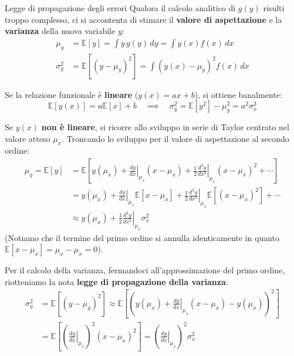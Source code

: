 \documentclass[openany,a4paper,12pt]{book}
\theoremstyle{remark}
\begin{document}
\begin{bressan}{Legge di propagazione degli errori}
Qualora il calcolo analitico di $g(y)$ risulti troppo complesso, ci si accontenta di stimare il \textbf{valore di aspettazione} e la \textbf{varianza} della nuova variabile $y$:
\begin{align*}
    \mu_y &= \mathbb{E}[y] = \int y \, g(y) \, dy = \int y(x) f(x) \, dx \\
    \sigma_y^2 &= \mathbb{E}[(y - \mu_y)^2] = \int (y(x) - \mu_y)^2 f(x) \, dx
\end{align*}

Se la relazione funzionale è \textbf{lineare} ($y(x) = ax + b$), si ottiene banalmente:
\begin{equation}
    \mathbb{E}[y(x)] = a\mathbb{E}[x] + b \quad \implies \quad \sigma_y^2 = \mathbb{E}[y^2] - \mu_y^2 = a^2\sigma_x^2
\end{equation}

Se $y(x)$ \textbf{non è lineare}, si ricorre allo sviluppo in serie di Taylor centrato nel valore atteso $\mu_x$. Troncando lo sviluppo per il valore di aspettazione al secondo ordine:
\begin{align*}
    \mu_y = \mathbb{E}[y] &= \mathbb{E} \left[ y(\mu_x) + \left. \frac{dy}{dx} \right|_{\mu_x} (x - \mu_x) + \frac{1}{2} \left. \frac{d^2y}{dx^2} \right|_{\mu_x} (x - \mu_x)^2 + \cdots \right] \\
    &= y(\mu_x) + \left. \frac{dy}{dx} \right|_{\mu_x} \mathbb{E}[x - \mu_x] + \frac{1}{2} \left. \frac{d^2y}{dx^2} \right|_{\mu_x} \mathbb{E}[(x - \mu_x)^2] + \cdots \\
    &\approx y(\mu_x) + \frac{1}{2} \left. \frac{d^2y}{dx^2} \right|_{\mu_x} \sigma_x^2
\end{align*}
(Notiamo che il termine del primo ordine si annulla identicamente in quanto $\mathbb{E}[x - \mu_x] = \mu_x - \mu_x = 0$).

Per il calcolo della varianza, fermandoci all'approssimazione del primo ordine, riotteniamo la nota \textbf{legge di propagazione della varianza}:
\begin{align*}
    \sigma_y^2 &= \mathbb{E}[(y - \mu_y)^2] \approx \mathbb{E} \left[ \left( y(\mu_x) + \left. \frac{dy}{dx} \right|_{\mu_x} (x - \mu_x) - y(\mu_x) \right)^2 \right] \\
    &= \mathbb{E} \left[ \left( \left. \frac{dy}{dx} \right|_{\mu_x} \right)^2 (x - \mu_x)^2 \right] = \left( \left. \frac{dy}{dx} \right|_{\mu_x} \right)^2 \sigma_x^2
\end{align*}
\end{bressan}
\end{document}
